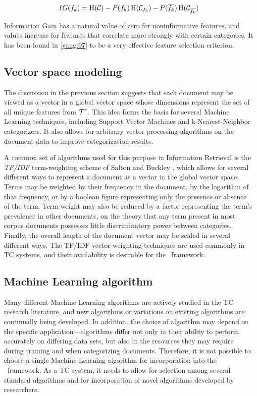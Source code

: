 \begin{equation} \label{eq-ig-def}
        IG(f_k) = \operatorname{H}(\mathcal{C})
                  - P(f_k) \operatorname{H}(\mathcal{C}_{f_k})
	          - P(\overline{f_k}) \operatorname{H}(\mathcal{C}_{\overline{f_k}})
\end{equation}

Information Gain has a natural value of zero for noninformative
features, and values increase for features that correlate more
strongly with certain categories.  It has been found in \ref{yang:97}
to be a very effective feature selection criterion.

\subsection{Vector space modeling}
\label{vector-space}

The discussion in the previous section suggests that each document may
be viewed as a vector in a global vector space whose dimensions
represent the set of all unique features from $\mathcal{T}^r$.  This idea
forms the basis for several Machine Learning techniques, including
Support Vector Machines and k-Nearest-Neighbor categorizers.  It also
allows for arbitrary vector processing algorithms on the document data
to improve categorization results.

A common set of algorithms used for this purpose in Information Retrieval is the \emph{TF/IDF}
term-weighting scheme of Salton and Buckley \cite{salton:88}, which
allows for several different ways to represent a document as a vector
in the global vector space.  Terms may be weighted by their frequency
in the document, by the logarithm of that frequency, or by a boolean
figure representing only the presence or absence of the term.  Term
weight may also be reduced by a factor representing the term's
prevalence in other documents, on the theory that any term present in
most corpus documents possesses little discriminatory power between
categories.
Finally, the overall length of the document vector may be
scaled in several different ways.  The TF/IDF vector weighting
techniques are used commonly in TC systems, and their availability is
desirable for the \aicat\ framework.

\subsection{Machine Learning algorithm}

Many different Machine Learning algorithms are actively studied in the
TC research literature, and new algorithms or variations on existing
algorithms are continually being developed.  In addition, the choice
of algorithm may depend on the specific application---algorithms
differ not only in their ability to perform accurately on differing
data sets, but also in the resources they may require during training
and when categorizing documents.  Therefore, it is not possible to
choose a single Machine Learning algorithm for incorporation into the
\aicat\ framework.  As a TC system, it needs to allow for selection
among several standard algorithms and for incorporation of novel
algorithms developed by researchers.

